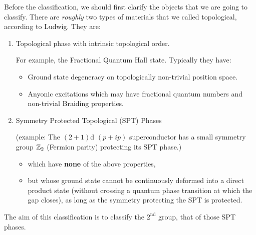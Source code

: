\documentclass{article}
\begin{document}
Before the classification, we should first clarify the objects that we
are going to classify. There are \textit{roughly} two types of
materials that we called topological, according to Ludwig. They are:
\begin{enumerate} %
    \item Topological phase with intrinsic topological order.
        
        For example, the Fractional Quantum Hall state. Typically they
        have:
        \begin{itemize}
            \item Ground state degeneracy on topologically non-trivial
                position space.
            \item Anyonic excitations which may have fractional
                quantum numbers and non-trivial Braiding properties.
        \end{itemize}

    \item Symmetry Protected Topological (SPT) Phases

        (example: The $(2+1)$d $(p+ip)$ superconductor has a small
        symmetry group $\mathbb{Z}_2$ (Fermion parity) protecting its SPT
        phase.)
        \begin{itemize}
            \item which have \textbf{none} of the above properties,
            \item but whose ground state cannot be continuously
                deformed into a direct product state (without crossing
                a quantum phase transition at which the gap closes),
                as long as the symmetry protecting the SPT is
                protected.
        \end{itemize}
\end{enumerate}

The aim of this classification is to classify the $2^{\text{nd}}$
group, that of those SPT phases.
\end{document}
